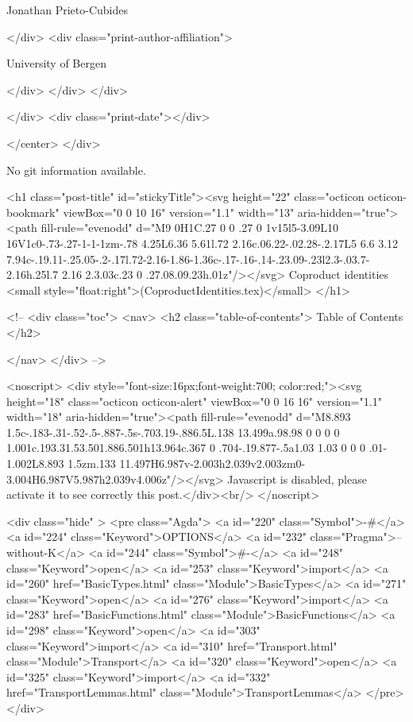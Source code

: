                   Jonathan Prieto-Cubides
                
              </div>
              <div class="print-author-affiliation">
                
                  University of Bergen
                
                </div>
            </div>
          </div>
          
          
        </div>
        <div class="print-date"></div>
        
        
    </center>
  </div>

  
  No git information available.
  

  <h1 class="post-title" id="stickyTitle"><svg height="22" class="octicon octicon-bookmark" viewBox="0 0 10 16" version="1.1" width="13" aria-hidden="true"><path fill-rule="evenodd" d="M9 0H1C.27 0 0 .27 0 1v15l5-3.09L10 16V1c0-.73-.27-1-1-1zm-.78 4.25L6.36 5.61l.72 2.16c.06.22-.02.28-.2.17L5 6.6 3.12 7.94c-.19.11-.25.05-.2-.17l.72-2.16-1.86-1.36c-.17-.16-.14-.23.09-.23l2.3-.03.7-2.16h.25l.7 2.16 2.3.03c.23 0 .27.08.09.23h.01z"/></svg> Coproduct identities <small style="float:right">(CoproductIdentities.tex)</small>
  </h1>

  <!-- 
  <div class="toc">
    <nav>
    <h2 class="table-of-contents"> Table of Contents </h2>
      

    </nav>
  </div>
   -->

  <noscript>
  <div style="font-size:16px;font-weight:700; color:red;"><svg height="18" class="octicon octicon-alert" viewBox="0 0 16 16" version="1.1" width="18" aria-hidden="true"><path fill-rule="evenodd" d="M8.893 1.5c-.183-.31-.52-.5-.887-.5s-.703.19-.886.5L.138 13.499a.98.98 0 0 0 0 1.001c.193.31.53.501.886.501h13.964c.367 0 .704-.19.877-.5a1.03 1.03 0 0 0 .01-1.002L8.893 1.5zm.133 11.497H6.987v-2.003h2.039v2.003zm0-3.004H6.987V5.987h2.039v4.006z"/></svg> Javascript is disabled, please activate it to see correctly this post.</div><br/>
  </noscript>

  <div class="hide" >
<pre class="Agda">
<a id="220" class="Symbol">{-#</a> <a id="224" class="Keyword">OPTIONS</a> <a id="232" class="Pragma">--without-K</a> <a id="244" class="Symbol">#-}</a>
<a id="248" class="Keyword">open</a> <a id="253" class="Keyword">import</a> <a id="260" href="BasicTypes.html" class="Module">BasicTypes</a>
<a id="271" class="Keyword">open</a> <a id="276" class="Keyword">import</a> <a id="283" href="BasicFunctions.html" class="Module">BasicFunctions</a>
<a id="298" class="Keyword">open</a> <a id="303" class="Keyword">import</a> <a id="310" href="Transport.html" class="Module">Transport</a>
<a id="320" class="Keyword">open</a> <a id="325" class="Keyword">import</a> <a id="332" href="TransportLemmas.html" class="Module">TransportLemmas</a>
</pre>
</div>

